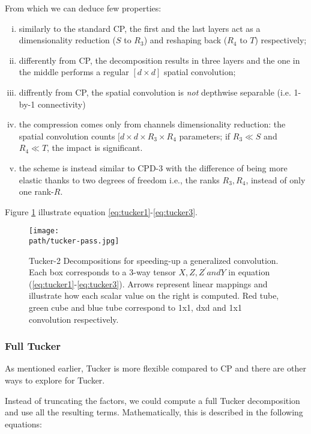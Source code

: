 From which we can deduce few properties: 
\begin{enumerate}[(i)]
	\item similarly to the standard CP, the first and the last layers act as a dimensionality reduction ($S $ to $R_3$) and reshaping back ($R_4$ to $T$) respectively; 
	
	\item differently from CP, the decomposition results in three layers and the one in the middle performs a regular $[d \times d]$ spatial convolution; 
	
	\item diffrently from CP, the spatial convolution is \emph{not} depthwise separable (i.e. 1-by-1 connectivity) 
	
	\item the compression comes only from channels dimensionality reduction: the spatial convolution counts $[d \times d \times R_3 \times R_4$ parameters; if $R_3 \ll S$ and $R_4 \ll T$, the impact is significant. 
	
	\item the scheme is instead similar to CPD-3 with the difference of being more elastic thanks to two degrees of freedom i.e., the ranks $R_3, R_4$, instead of only one rank-$R$.
\end{enumerate}

Figure \ref{fig:tucker-pass} illustrate equation \ref{eq:tucker1}-\ref{eq:tucker3}. 

\begin{figure}[h!]
 \centering
 \texttt{[image: \\path/tucker-pass.jpg]} 
 \caption{Tucker-2  Decompositions  for  speeding-up  a generalized convolution. Each box corresponds to a 3-way tensor $X, Z, Z^' and Y$ in equation (\ref{eq:tucker1}-\ref{eq:tucker3}). Arrows represent linear mappings and illustrate how each scalar value on the right is computed. Red tube, green cube and blue tube correspond to 1x1, dxd and 1x1 convolution respectively.}
 \label{fig:tucker-pass}
\end{figure}


\subsubsection{Full Tucker}
As mentioned earlier, Tucker is more flexible compared to CP and there are other ways to explore for Tucker. 

Instead of truncating the factors, we could compute a full Tucker decomposition and use all the resulting terms. Mathematically, this is described in the following equations:  



